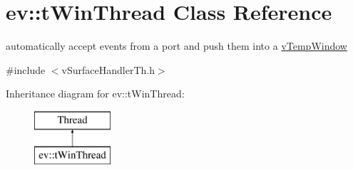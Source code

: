 \hypertarget{classev_1_1tWinThread}{}\section{ev\+:\+:t\+Win\+Thread Class Reference}
\label{classev_1_1tWinThread}


automatically accept events from a port and push them into a \hyperlink{classev_1_1vTempWindow}{v\+Temp\+Window}  




{\ttfamily \#include $<$v\+Surface\+Handler\+Th.\+h$>$}

Inheritance diagram for ev\+:\+:t\+Win\+Thread\+:\begin{figure}[H]
\begin{center}
\leavevmode
\includegraphics[height=2.000000cm]{classev_1_1tWinThread}
\end{center}
\end{figure}

